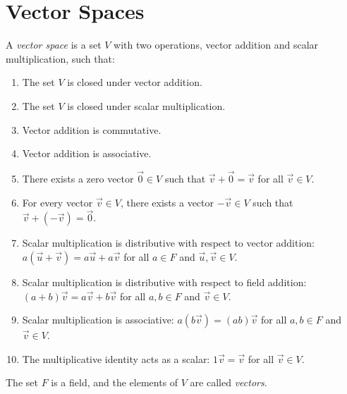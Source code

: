 \newpage
\section{Vector Spaces}

A \emph{vector space} is a set \(V\) with two operations, vector addition and scalar multiplication, 
such that:

\begin{enumerate}[label=\Roman*.]

	\item The set \(V\) is closed under vector addition.

	\item The set \(V\) is closed under scalar multiplication.

	\item Vector addition is commutative.

	\item Vector addition is associative.

	\item There exists a zero vector \(\vec{0} \in V\) such that \(\vec{v} + \vec{0} = \vec{v}\) 
		  for all \(\vec{v} \in V\).

	\item For every vector \(\vec{v} \in V\), there exists a vector \(-\vec{v} \in V\) such that 
	      \(\vec{v} + (-\vec{v}) = \vec{0}\).

	\item Scalar multiplication is distributive with respect to vector addition: 
	      \(a(\vec{u} + \vec{v}) = a\vec{u} + a\vec{v}\) for all \(a \in F\) and 
		  \(\vec{u}, \vec{v} \in V\).

	\item Scalar multiplication is distributive with respect to field addition: 
	      \((a + b)\vec{v} = a\vec{v} + b\vec{v}\) for all \(a, b \in F\) and \(\vec{v} \in V\).

	\item Scalar multiplication is associative: \(a(b\vec{v}) = (ab)\vec{v}\) for all \(a, b \in F\) 
	      and \(\vec{v} \in V\).

	\item The multiplicative identity acts as a scalar: \(1\vec{v} = \vec{v}\) for all \(\vec{v} \in V\).

\end{enumerate}

The set \(F\) is a field, and the elements of \(V\) are called \emph{vectors}.
\vspace{\baselineskip}

